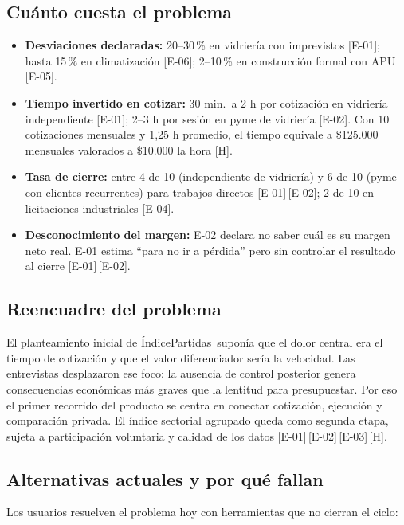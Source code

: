 \documentclass[11pt]{article}
\newcommand{\ev}[1]{\textcolor{prblue}{[#1]}}
\newcommand{\hip}{\textcolor{prorange}{[H]}}
\newcommand{\producto}{ÍndicePartidas}
\begin{document}
\subsection{Cuánto cuesta el problema}

\begin{itemize}
  \item \textbf{Desviaciones declaradas:} 20--30\,\% en vidriería con imprevistos
  \ev{E-01}; hasta 15\,\% en climatización \ev{E-06}; 2--10\,\% en construcción
  formal con APU \ev{E-05}.
  \item \textbf{Tiempo invertido en cotizar:} 30 min.\ a 2 h por cotización en
  vidriería independiente \ev{E-01}; 2--3 h por sesión en pyme de vidriería
  \ev{E-02}. Con 10 cotizaciones mensuales y 1,25 h promedio, el tiempo equivale
  a \$125.000 mensuales valorados a \$10.000 la hora \hip.
  \item \textbf{Tasa de cierre:} entre 4 de 10 (independiente de vidriería) y
  6 de 10 (pyme con clientes recurrentes) para trabajos directos \ev{E-01}\,\ev{E-02};
  2 de 10 en licitaciones industriales \ev{E-04}.
  \item \textbf{Desconocimiento del margen:} E-02 declara no saber cuál es su
  margen neto real. E-01 estima ``para no ir a pérdida'' pero sin controlar el
  resultado al cierre \ev{E-01}\,\ev{E-02}.
\end{itemize}

\subsection{Reencuadre del problema}

El planteamiento inicial de \producto\ suponía que el dolor central era el tiempo
de cotización y que el valor diferenciador sería la velocidad. Las entrevistas
desplazaron ese foco: la ausencia de control posterior genera consecuencias económicas
más graves que la lentitud para presupuestar. Por eso el primer recorrido del
producto se centra en conectar cotización, ejecución y comparación privada. El
índice sectorial agrupado queda como segunda etapa, sujeta a participación voluntaria
y calidad de los datos \ev{E-01}\,\ev{E-02}\,\ev{E-03}\,\hip.

\subsection{Alternativas actuales y por qué fallan}

Los usuarios resuelven el problema hoy con herramientas que no cierran el ciclo:
\end{document}
